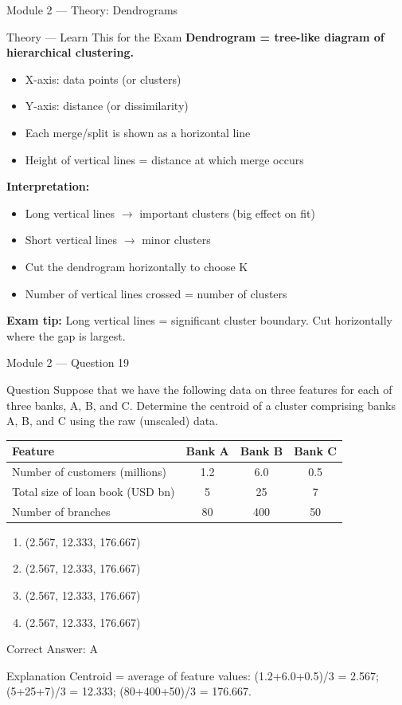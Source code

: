\documentclass[aspectratio=169,10pt]{beamer}
\newcommand{\question}[1]{%
	\begin{block}{Question}
		#1
	\end{block}
}
\newcommand{\options}[4]{%
	\begin{enumerate}[label=\Alph*.,leftmargin=*]
		\item #1
		\item #2
		\item #3
		\item #4
	\end{enumerate}
}
\newcommand{\answerbox}[1]{%
	\begin{exampleblock}{Correct Answer: #1}
	\end{exampleblock}
}
\newcommand{\explain}[1]{%
	\begin{block}{Explanation}
		\small #1
	\end{block}
}
\newcommand{\theory}[1]{%
	\begin{block}{Theory --- Learn This for the Exam}
		\small #1
	\end{block}
}
\begin{document}
	\begin{frame}{Module 2 --- Theory: Dendrograms}
		\theory{
			\textbf{Dendrogram = tree-like diagram of hierarchical clustering.}
			\begin{itemize}
				\item X-axis: data points (or clusters)
				\item Y-axis: distance (or dissimilarity)
				\item Each merge/split is shown as a horizontal line
				\item Height of vertical lines = distance at which merge occurs
			\end{itemize}
			\textbf{Interpretation:}
			\begin{itemize}
				\item Long vertical lines $\rightarrow$ important clusters (big effect on fit)
				\item Short vertical lines $\rightarrow$ minor clusters
				\item Cut the dendrogram horizontally to choose K
				\item Number of vertical lines crossed = number of clusters
			\end{itemize}
			\textbf{Exam tip:} Long vertical lines = significant cluster boundary. Cut horizontally where the gap is largest.
		}
	\end{frame}
	
	\begin{frame}{Module 2 --- Question 19}
		\question{Suppose that we have the following data on three features for each of three banks, A, B, and C. Determine the centroid of a cluster comprising banks A, B, and C using the raw (unscaled) data.}
		\begin{center}
			\small
			\begin{tabular}{@{}lccc@{}}
				\toprule
				Feature & Bank A & Bank B & Bank C \\
				\midrule
				Number of customers (millions) & 1.2 & 6.0 & 0.5 \\
				Total size of loan book (USD bn) & 5 & 25 & 7 \\
				Number of branches & 80 & 400 & 50 \\
				\bottomrule
			\end{tabular}
		\end{center}
		\options{(2.567, 12.333, 176.667)}{(2.567, 12.333, 176.667)}{(2.567, 12.333, 176.667)}{(2.567, 12.333, 176.667)}
		\answerbox{A}
		\explain{Centroid = average of feature values: (1.2+6.0+0.5)/3 = 2.567; (5+25+7)/3 = 12.333; (80+400+50)/3 = 176.667.}
	\end{frame}
	
\end{document}
